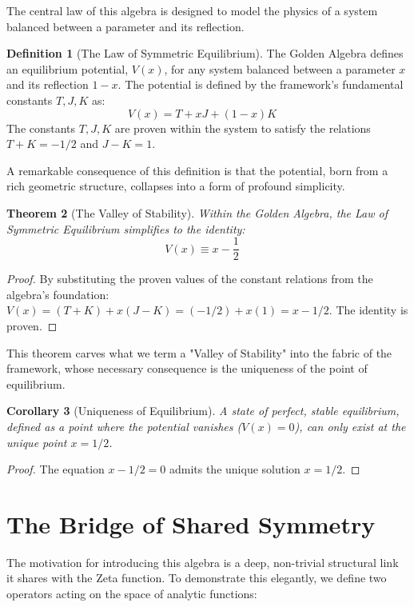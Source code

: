 \documentclass{article}
\theoremstyle{plain}
\newtheorem{theorem}{Theorem}[section]
\newtheorem{corollary}[theorem]{Corollary}
\theoremstyle{definition}
\newtheorem{definition}[theorem]{Definition}
\theoremstyle{remark}
\begin{document}
The central law of this algebra is designed to model the physics of a system balanced between a parameter and its reflection.

\begin{definition}[The Law of Symmetric Equilibrium]
The Golden Algebra defines an equilibrium potential, $V(x)$, for any system balanced between a parameter $x$ and its reflection $1-x$. The potential is defined by the framework's fundamental constants $T, J, K$ as:
$$V(x) = T + xJ + (1-x)K \quad \text{}$$
The constants $T, J, K$ are proven within the system to satisfy the relations $T+K = -1/2$ and $J-K=1$.
\end{definition}

A remarkable consequence of this definition is that the potential, born from a rich geometric structure, collapses into a form of profound simplicity.

\begin{theorem}[The Valley of Stability]
Within the Golden Algebra, the Law of Symmetric Equilibrium simplifies to the identity:
$$ V(x) \equiv x - \frac{1}{2} \quad \text{}$$
\end{theorem}
\begin{proof}
By substituting the proven values of the constant relations from the algebra's foundation:
$V(x) = (T+K) + x(J-K) = (-1/2) + x(1) = x - 1/2$. The identity is proven.
\end{proof}

This theorem carves what we term a "Valley of Stability" into the fabric of the framework, whose necessary consequence is the uniqueness of the point of equilibrium.

\begin{corollary}[Uniqueness of Equilibrium]
A state of perfect, stable equilibrium, defined as a point where the potential vanishes ($V(x)=0$), can only exist at the unique point $x=1/2$.
\end{corollary}
\begin{proof}
The equation $x - 1/2 = 0$ admits the unique solution $x=1/2$.
\end{proof}

\section{The Bridge of Shared Symmetry}
\label{sec:bridge}

The motivation for introducing this algebra is a deep, non-trivial structural link it shares with the Zeta function. To demonstrate this elegantly, we define two operators acting on the space of analytic functions:
\end{document}
